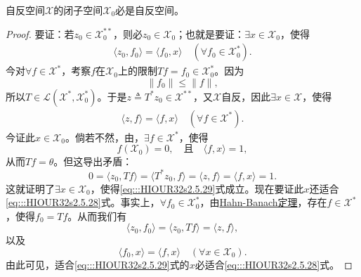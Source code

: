 \documentclass[../../main.tex]{subfiles}%
\begin{document}
\begin{theorem}[Pettis定理]\label{theorem:Pettis定理}
自反空间$\mathscr{X}$的闭子空间$\mathscr{X}_0$必是自反空间。
\end{theorem}
\begin{proof}
要证：若$z_0\in\mathscr{X}_0^{**}$，则必$z_0\in\mathscr{X}_0$；也就是要证：$\exists x\in\mathscr{X}_0$，使得
\begin{align}
\langle z_0,f_0\rangle=\langle f_0,x\rangle\quad(\forall f_0\in\mathscr{X}_0^*).\label{eq:::HIOUR32s2.5.28}
\end{align}
今对$\forall f\in\mathscr{X}^*$，考察$f$在$\mathscr{X}_0$上的限制$Tf=f_0\in\mathscr{X}_0^*$。因为
$$\|f_0\|\leqslant\|f\|,$$
所以$T\in\mathscr{L}(\mathscr{X}^*,\mathscr{X}_0^*)$。于是$z\triangleq T^*z_0\in\mathscr{X}^{**}$，又$\mathscr{X}$自反，因此$\exists x\in\mathscr{X}$，使得
\begin{align}
\langle z,f\rangle=\langle f,x\rangle\quad(\forall f\in\mathscr{X}^*).\label{eq:::HIOUR32s2.5.29}
\end{align}
今证此$x\in\mathscr{X}_0$。倘若不然，由，$\exists f\in\mathscr{X}^*$，使得
$$f(\mathscr{X}_0)=0,\quad\text{且}\quad\langle f,x\rangle=1,$$
从而$Tf=\theta$。但这导出矛盾：
$$0=\langle z_0,Tf\rangle=\langle T^*z_0,f\rangle=\langle z,f\rangle=\langle f,x\rangle=1.$$
这就证明了$\exists x\in\mathscr{X}_0$，使得\eqref{eq:::HIOUR32s2.5.29}式成立。现在要证此$x$还适合\eqref{eq:::HIOUR32s2.5.28}式。事实上，$\forall f_0\in\mathscr{X}_0^*$，由\hyperref[theorem:泛函分析--(哈恩-巴拿赫)Hahn-Banach定理]{Hahn-Banach定理}，存在$f\in\mathscr{X}^*$，使得$f_0=Tf$。从而我们有
$$\langle z_0,f_0\rangle=\langle z_0,Tf\rangle=\langle z,f\rangle,$$
以及
$$\langle f_0,x\rangle=\langle f,x\rangle\quad(\forall x\in\mathscr{X}_0).$$
由此可见，适合\eqref{eq:::HIOUR32s2.5.29}式的$x$必适合\eqref{eq:::HIOUR32s2.5.28}式。
\end{proof}
\end{document}
